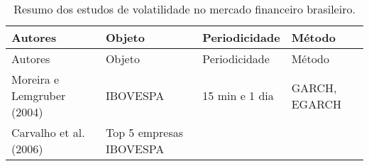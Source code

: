 \documentclass[]{article}
\begin{document}
\begin{longtable}[]{@{}llll@{}}
\caption{Resumo dos estudos de volatilidade no mercado financeiro
brasileiro.}\tabularnewline
\toprule
\begin{minipage}[b]{0.17\columnwidth}\raggedright\strut
Autores\strut
\end{minipage} & \begin{minipage}[b]{0.17\columnwidth}\raggedright\strut
Objeto\strut
\end{minipage} & \begin{minipage}[b]{0.15\columnwidth}\raggedright\strut
Periodicidade\strut
\end{minipage} & \begin{minipage}[b]{0.23\columnwidth}\raggedright\strut
Método\strut
\end{minipage}\tabularnewline
\midrule
\endfirsthead
\toprule
\begin{minipage}[b]{0.17\columnwidth}\raggedright\strut
Autores\strut
\end{minipage} & \begin{minipage}[b]{0.17\columnwidth}\raggedright\strut
Objeto\strut
\end{minipage} & \begin{minipage}[b]{0.15\columnwidth}\raggedright\strut
Periodicidade\strut
\end{minipage} & \begin{minipage}[b]{0.23\columnwidth}\raggedright\strut
Método\strut
\end{minipage}\tabularnewline
\midrule
\endhead
\begin{minipage}[t]{0.17\columnwidth}\raggedright\strut
Moreira e Lemgruber (2004)\strut
\end{minipage} & \begin{minipage}[t]{0.17\columnwidth}\raggedright\strut
IBOVESPA\strut
\end{minipage} & \begin{minipage}[t]{0.15\columnwidth}\raggedright\strut
15 min e 1 dia\strut
\end{minipage} & \begin{minipage}[t]{0.23\columnwidth}\raggedright\strut
GARCH, EGARCH\strut
\end{minipage}\tabularnewline
\begin{minipage}[t]{0.17\columnwidth}\raggedright\strut
Carvalho et al. (2006)\strut
\end{minipage} & \begin{minipage}[t]{0.17\columnwidth}\raggedright\strut
Top 5 empresas IBOVESPA\strut

\end{minipage}
\end{longtable}
\end{document}
